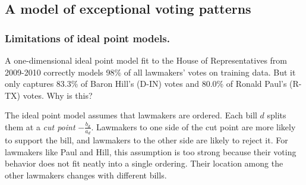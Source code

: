 \subsection{A model of exceptional voting patterns}
\label{section:exceptional_model}

\subsubsection{Limitations of ideal point models.}

A one-dimensional ideal point model fit to the House of
Representatives from 2009-2010 correctly models 98\% of all lawmakers'
votes on training data. But it only captures 83.3\% of Baron Hill's
(D-IN) votes and 80.0\% of Ronald Paul's (R-TX) votes.  Why is this?

The ideal point model assumes that lawmakers are ordered.  Each bill
$d$ splits them at a \emph{cut point} $-\frac{b_d}{a_d}$.  Lawmakers
to one side of the cut point are more likely to support the bill, and
lawmakers to the other side are likely to reject it.  For lawmakers
like Paul and Hill, this assumption is too strong because
their voting behavior does not fit neatly into a single ordering.
Their location among the other lawmakers changes with different bills.


